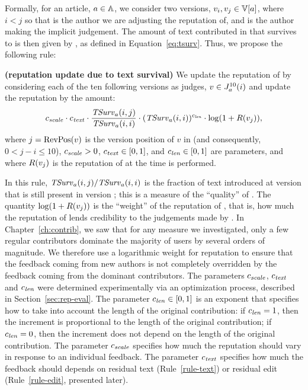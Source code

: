 Formally, for an article, $a \in \mathbb{A}$,
we consider two versions, $\version{i}, \version{j} \in \versions{a}$,
where $i < j$ so that  is the author we are
adjusting the reputation of, and  is the author
making the implicit judgement.
The amount of text contributed in  that survives
to  is then given by , as defined in
Equation~\ref{eq:tsurv}.
Thus, we propose the following rule:

\begin{regola}
\textbf{(reputation update due to text survival)}
\label{rule-text}
  We update the reputation of  by considering
  each of the ten following versions as judges,
  $v \in J_{a}^{10}(i)$ and update the reputation by the amount:
  \[
    {c_{{\text{\textit{scale}}}}} \cdot {c_{{\text{\textit{text}}}}} \cdot \frac{\mathit{TSurv}_{a}(i,j)}{\mathit{TSurv}_{a}(i,i)} 
    \cdot (\mathit{TSurv}_{a}(i,i))^{c_{{\text{\textit{len}}}}} \cdot \log(1 + R(v_{j})),
  \]
  where $j = \mathrm{RevPos}(v)$ is the version position of $v$ in 
  (and consequently, $0 < j - i \le 10$),
  ${c_{{\text{\textit{scale}}}}} > 0$, ${c_{{\text{\textit{text}}}}} \in [0,1]$, and ${c_{{\text{\textit{len}}}}} \in
  [0,1]$ are parameters, and where $R(v_{j})$ is the reputation of
   at the time  is performed.
\end{regola}

\noindent
In this rule, $\mathit{TSurv}_{a}(i,j) / \mathit{TSurv}_{a}(i,i)$ is the fraction of text
introduced at version  that is still present in version ;
this is a measure of the ``quality'' of . 
The quantity $\log(1 + R(v_{j}))$ is the ``weight'' of the
reputation of ,
that is, how much the reputation of  lends
credibility to the judgements made by . 
In Chapter~\ref{ch:contrib}, we saw that for any measure we investigated,
only a few regular contributors dominate the majority of users by
several orders of magnitude.
We therefore use a logarithmic weight for reputation
to ensure that the feedback coming from new authors is not completely
overridden by the feedback coming from the dominant contributors. 
The parameters ${c_{{\text{\textit{scale}}}}}$, ${c_{{\text{\textit{text}}}}}$ and ${c_{{\text{\textit{len}}}}}$ were
determined experimentally via an optimization process, described
in Section~\ref{sec:rep-eval}.
The parameter ${c_{{\text{\textit{len}}}}} \in [0,1]$ is an exponent that specifies how
to take into account the length of the original contribution: if
${c_{{\text{\textit{len}}}}} = 1$, then the increment is proportional to the length of
the original contribution; if ${c_{{\text{\textit{len}}}}} = 0$, then the increment
does not depend on the length of the original contribution.
The parameter ${c_{{\text{\textit{scale}}}}}$ specifies how much the reputation should
vary in response to an individual feedback. 
The parameter ${c_{{\text{\textit{text}}}}}$ specifies how much the feedback should 
depends on residual text (Rule~\ref{rule-text}) or residual edit
(Rule~\ref{rule-edit}, presented later). 


